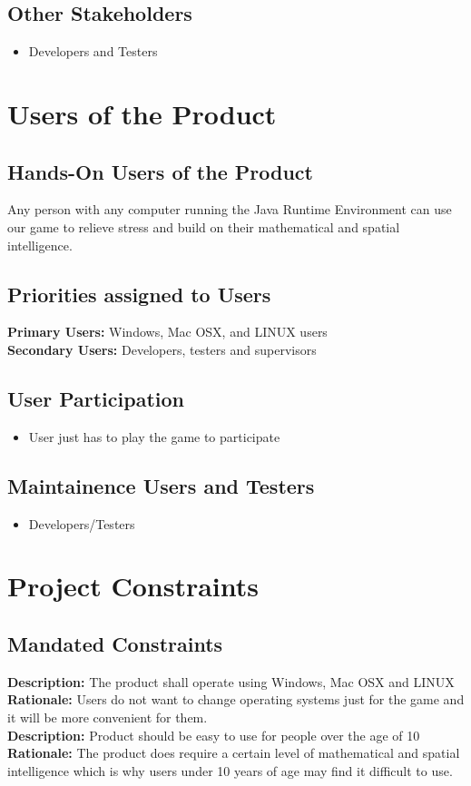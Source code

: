 \subsection{Other Stakeholders}
\begin{itemize}
\item Developers and Testers
\end{itemize}

\section{Users of the Product}
\subsection{Hands-On Users of the Product}
\par\indent\indent Any person with any computer running the Java Runtime Environment can use our game to 
relieve stress and build on their mathematical and spatial intelligence. 
\subsection{Priorities assigned to Users}
\textbf{Primary Users:} Windows, Mac OSX, and LINUX users
\\
\textbf{Secondary Users:} Developers, testers and supervisors

\subsection{User Participation}
\begin{itemize}
\item User just has to play the game to participate
\end{itemize}
\subsection{Maintainence Users and Testers}
\begin{itemize}
\item Developers/Testers
\end{itemize}

\section{Project Constraints}
\subsection{Mandated Constraints}
\textbf{Description:} The product shall operate using Windows, Mac OSX and 
LINUX\\
\textbf{Rationale:} Users do not want to change operating systems just for the 
game and it will be more convenient for them.\\
\textbf{Description:} Product should be easy to use for people over the age 
of 10\\
\textbf{Rationale:} The product does require a certain level of mathematical 
and spatial intelligence which is why users under 10 years of age may find it 
difficult to use. 
